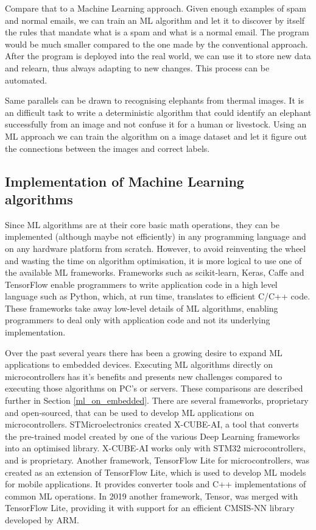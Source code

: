 Compare that to a Machine Learning approach. 
Given enough examples of spam and normal emails, we can train an ML algorithm and let it to discover by itself the rules that mandate what is a spam and what is a normal email.
The program would be much smaller compared to the one made by the conventional approach. 
After the program is deployed into the real world, we can use it to store new data and relearn, thus always adapting to new changes.
This process can be automated.

Same parallels can be drawn to recognising elephants from thermal images.
It is an difficult task to write a deterministic algorithm that could identify an elephant successfully from an image and not confuse it for a human or livestock. 
Using an ML approach we can train the algorithm on a image dataset and let it figure out the connections between the images and correct labels. 


\subsection{ Implementation of Machine Learning algorithms}

Since ML algorithms are at their core basic math operations, they can be implemented (although maybe not efficiently) in any programming language and on any hardware platform from scratch.
However, to avoid reinventing the wheel and wasting the time on algorithm optimisation, it is more logical to use one of the available ML frameworks.
Frameworks such as scikit-learn, Keras, Caffe and TensorFlow enable programmers to write application code in a high level language such as Python, which, at run time, translates to efficient C/C++ code. 
These frameworks take away low-level details of ML algorithms, enabling programmers to deal only with application code and not its underlying implementation.

Over the past several years there has been a growing desire to expand ML applications to embedded devices.
Executing ML algorithms directly on microcontrollers has it's benefits and presents new challenges compared to executing those algorithms on PC's or servers.
These comparisons are described further in Section \ref{ml_on_embedded}.
There are several frameworks, proprietary and open-sourced, that can be used to develop ML applications on microcontrollers.
STMicroelectronics created X-CUBE-AI, a tool that converts the pre-trained model created by one of the various Deep Learning frameworks into an optimised library. 
X-CUBE-AI works only with STM32 microcontrollers, and is proprietary.
Another framework, TensorFlow Lite for microcontrollers, was created as an extension of TensorFlow Lite, which is used to develop ML models for mobile applications.
It provides converter tools and C++ implementations of common ML operations.
In 2019 another framework, \si{\micro}Tensor, was merged with TensorFlow Lite, providing it with support for an efficient CMSIS-NN library developed by ARM.

